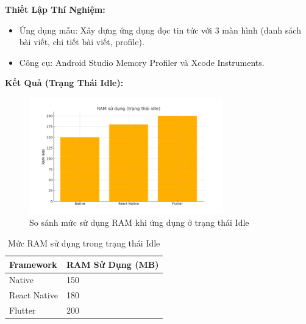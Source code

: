     \begin{flushleft}
      \hspace*{0.8cm}\textbf{Thiết Lập Thí Nghiệm:}
      \setlength{\leftmargini}{1.5cm}
      \begin{itemize}
        \item Ứng dụng mẫu: Xây dựng ứng dụng đọc tin tức với 3 màn hình (danh sách bài viết, chi tiết bài viết, profile).
        \item Công cụ: Android Studio Memory Profiler và Xcode Instruments.
      \end{itemize}
    \end{flushleft}
    
    \vspace{0.5em}
    
    \begin{flushleft}
      \hspace*{0.8cm}\textbf{Kết Quả (Trạng Thái Idle):}
    \end{flushleft}
    
    \begin{figure}[H]
        \centering
        \includegraphics[width=0.75\textwidth]{images/idle_memory_usage.png}
        \caption{So sánh mức sử dụng RAM khi ứng dụng ở trạng thái Idle}
    \end{figure}
    
    \vspace{0.5em}
    
    \begin{table}[H]
      \centering
      \begin{tabular}{|p{5cm}|p{7cm}|}
      \hline
      \textbf{Framework} & \textbf{RAM Sử Dụng (MB)} \\
      \hline
      Native       & 150 \\
      React Native & 180 \\
      Flutter      & 200 \\
      \hline
      \end{tabular}
      \caption{Mức RAM sử dụng trong trạng thái Idle}
  \end{table}
  

